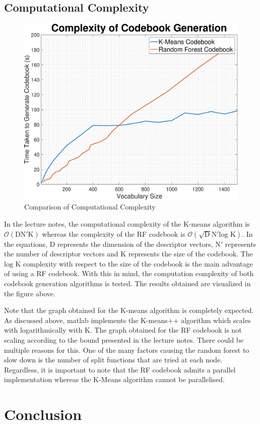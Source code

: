 \documentclass[a4paper,pra,twocolumn,10pt,aps,longbibliography,nobalancelastpage]{article}
\begin{document}
\subsection{Computational Complexity}

\begin{figure}[H]
	\centering
    \includegraphics[width=0.49\columnwidth]{rf_complex}
    \caption{Comparison of Computational Complexity}
\end{figure}


In the lecture notes, the computational complexity of the K-means algorithm is $\mathcal{O}(\text{DN}'\text{K})$ whereas the complexity of the RF codebook is $\mathcal{O}(\sqrt{\text{D}}\text{N}'\text{log K})$. In the equations, $\text{D}$ represents the dimension of the descriptor vectors, $\text{N}'$ represents the number of descriptor vectors and $\text{K}$ represents the size of the codebook. The $\text{log \ K}$ complexity with respect to the size of the codebook is the main advantage of using a RF codebook. With this in mind, the computation complexity of both codebook generation algorithms is tested. The results obtained are visualized in the figure above.
 
Note that the graph obtained for the K-means algorithm is completely expected. As discussed above, matlab implements the K-means++ algorithm which scales with logarithmically with K. The graph obtained for the RF codebook is not scaling according to the bound presented in the lecture notes. There could be multiple reasons for this. One of the many factors causing the random forest to slow down is the number of split functions that are tried at each node. Regardless, it is important to note that the RF codebook admits a parallel implementation whereas the K-Means algorithm cannot be parallelised. 

\section{Conclusion}
\end{document}
